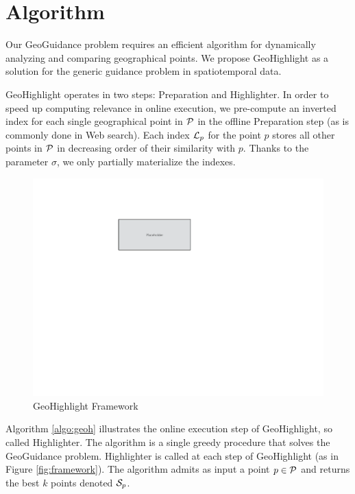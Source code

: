\section{Algorithm}
\label{sec:algo}
Our {\sc GeoGuidance} problem requires an efficient algorithm for dynamically analyzing and comparing geographical points. We propose {\sc GeoHighlight} as a solution for the generic guidance problem in spatiotemporal data. 

{\sc GeoHighlight} operates in two steps: {\sc Preparation} and {\sc Highlighter}. In order to speed up computing relevance in online execution, we pre-compute an inverted index for each single geographical point in ${\cal P}$ in the offline {\sc Preparation} step (as is commonly done in Web search). Each index ${\cal L}_p$ for the point $p$ stores all other points in ${\cal P}$ in decreasing order of their similarity with $p$. Thanks to the parameter $\sigma$, we only partially materialize the indexes.


\begin{figure}
  \centering
  \includegraphics[width=\columnwidth]{figs/placeholder}
\caption{{\sc GeoHighlight} Framework}
\label{fig:framwork}
\end{figure}

Algorithm \ref{algo:geoh} illustrates the online execution step of {\sc GeoHighlight}, so called {\sc Highlighter}. The algorithm is a single greedy procedure that solves the {\sc GeoGuidance} problem. {\sc Highlighter} is called at each step of {\sc GeoHighlight} (as in Figure \ref{fig:framework}). The algorithm admits as input a point $p \in {\cal P}$ and returns the best $k$ points denoted ${\cal S}_p$.

